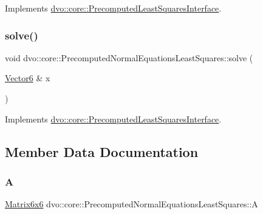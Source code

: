 Implements \mbox{\hyperlink{classdvo_1_1core_1_1_precomputed_least_squares_interface_a55870a4fa167484edf3e9b8120ad3232}{dvo\+::core\+::\+Precomputed\+Least\+Squares\+Interface}}.

\mbox{\label{classdvo_1_1core_1_1_precomputed_normal_equations_least_squares_a9749ed4314ae7ed7dbfa05c35a9e4a51}} 
\subsubsection{\texorpdfstring{solve()}{solve()}}
{\footnotesize\ttfamily void dvo\+::core\+::\+Precomputed\+Normal\+Equations\+Least\+Squares\+::solve (\begin{DoxyParamCaption}\item[{\mbox{\hyperlink{namespacedvo_1_1core_a05327f3312d32a301bce9fccda9e5807}{Vector6}} \&}]{x }\end{DoxyParamCaption})\hspace{0.3cm}{\ttfamily [virtual]}}



Implements \mbox{\hyperlink{classdvo_1_1core_1_1_precomputed_least_squares_interface_a036a293d0a53a7b019f8942776fb5d29}{dvo\+::core\+::\+Precomputed\+Least\+Squares\+Interface}}.



\subsection{Member Data Documentation}
\mbox{\label{classdvo_1_1core_1_1_precomputed_normal_equations_least_squares_a95ecca09c734f950f5e6c03d2e1c5e76}} 
\subsubsection{\texorpdfstring{A}{A}}
{\footnotesize\ttfamily \mbox{\hyperlink{namespacedvo_1_1core_a7b76cdc563f01ec2220fd58316004626}{Matrix6x6}} dvo\+::core\+::\+Precomputed\+Normal\+Equations\+Least\+Squares\+::A}

